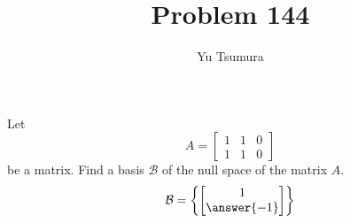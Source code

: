 \documentclass{ximera}
\title{Problem 144}
\author{Yu Tsumura}
\begin{document}
\begin{problem}
  
  Let 
  \[A=\begin{bmatrix}
      1 & 1 & 0 \\
      1 &1 &0 
    \end{bmatrix}\]
  be a matrix. Find a basis $\mathcal{B}$ of the null space of the matrix $A$.
  \[
    \mathcal{B} = \left\{
        \begin{bmatrix}
          1  \\
          \answer{-1}  
        \end{bmatrix}
      \right\}
  \]
 \end{problem}
\end{document}
